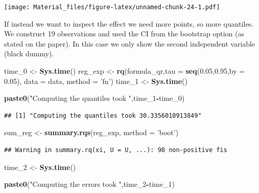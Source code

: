 \documentclass[]{book}
\newenvironment{Shaded}{\begin{snugshade}}{\end{snugshade}}
\newcommand{\KeywordTok}[1]{\textcolor[rgb]{0.13,0.29,0.53}{\textbf{#1}}}
\newcommand{\DataTypeTok}[1]{\textcolor[rgb]{0.13,0.29,0.53}{#1}}
\newcommand{\DecValTok}[1]{\textcolor[rgb]{0.00,0.00,0.81}{#1}}
\newcommand{\FloatTok}[1]{\textcolor[rgb]{0.00,0.00,0.81}{#1}}
\newcommand{\StringTok}[1]{\textcolor[rgb]{0.31,0.60,0.02}{#1}}
\newcommand{\OperatorTok}[1]{\textcolor[rgb]{0.81,0.36,0.00}{\textbf{#1}}}
\newcommand{\NormalTok}[1]{#1}
\begin{document}
\texttt{[image: Material\_files/figure-latex/unnamed-chunk-24-1.pdf]}

If instead we want to inspect the effect we need more points, so more
quantiles. We construct 19 observations and used the CI from the
bootstrap option (as stated on the paper). In this case we only show the
second independent variable (black dummy).

\begin{Shaded}
\begin{Highlighting}[]
\NormalTok{time_}\DecValTok{0}\NormalTok{ <-}\StringTok{ }\KeywordTok{Sys.time}\NormalTok{()}
\NormalTok{reg_exp <-}\StringTok{ }\KeywordTok{rq}\NormalTok{(formula_qr,}\DataTypeTok{tau =} \KeywordTok{seq}\NormalTok{(}\FloatTok{0.05}\NormalTok{,}\FloatTok{0.95}\NormalTok{,}\DataTypeTok{by =} \FloatTok{0.05}\NormalTok{), }\DataTypeTok{data =}\NormalTok{ data, }\DataTypeTok{method =} \StringTok{'fn'}\NormalTok{)}
\NormalTok{time_}\DecValTok{1}\NormalTok{ <-}\StringTok{ }\KeywordTok{Sys.time}\NormalTok{()}

\KeywordTok{paste0}\NormalTok{(}\StringTok{"Computing the quantiles took "}\NormalTok{,time_}\DecValTok{1}\OperatorTok{-}\NormalTok{time_}\DecValTok{0}\NormalTok{)}
\end{Highlighting}
\end{Shaded}

\begin{verbatim}
## [1] "Computing the quantiles took 30.3356010913849"
\end{verbatim}

\begin{Shaded}
\begin{Highlighting}[]
\NormalTok{sum_reg <-}\StringTok{ }\KeywordTok{summary.rqs}\NormalTok{(reg_exp, }\DataTypeTok{method =} \StringTok{'boot'}\NormalTok{)}
\end{Highlighting}
\end{Shaded}

\begin{verbatim}
## Warning in summary.rq(xi, U = U, ...): 98 non-positive fis
\end{verbatim}

\begin{Shaded}
\begin{Highlighting}[]
\NormalTok{time_}\DecValTok{2}\NormalTok{ <-}\StringTok{ }\KeywordTok{Sys.time}\NormalTok{()}

\KeywordTok{paste0}\NormalTok{(}\StringTok{"Computing the errors took "}\NormalTok{,time_}\DecValTok{2}\OperatorTok{-}\NormalTok{time_}\DecValTok{1}\NormalTok{)}
\end{Highlighting}
\end{Shaded}
\end{document}
